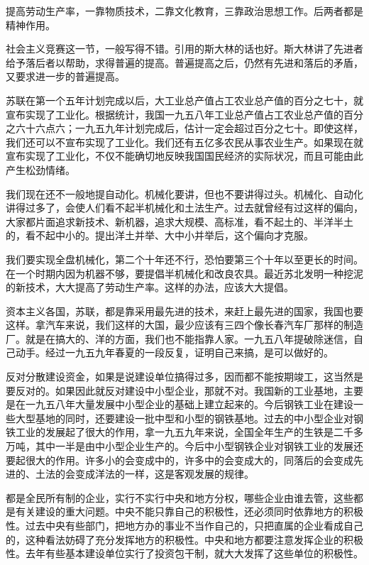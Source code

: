 提高劳动生产率，一靠物质技术，二靠文化教育，三靠政治思想工作。后两者都是精神作用。

社会主义竞赛这一节，一般写得不错。引用的斯大林的话也好。斯大林讲了先进者给予落后者以帮助，求得普遍的提高。普遍提高之后，仍然有先进和落后的矛盾，又要求进一步的普遍提高。

苏联在第一个五年计划完成以后，大工业总产值占工农业总产值的百分之七十，就宣布实现了工业化。根据统计，我国一九五八年工业总产值占工农业总产值的百分之六十六点六；一九五九年计划完成后，估计一定会超过百分之七十。即使这样，我们还可以不宣布实现了工业化。我们还有五亿多农民从事农业生产。如果现在就宣布实现了工业化，不仅不能确切地反映我国国民经济的实际状况，而且可能由此产生松劲情绪。

我们现在还不一般地提自动化。机械化要讲，但也不要讲得过头。机械化、自动化讲得过多了，会使人们看不起半机械化和土法生产。过去就曾经有过这样的偏向，大家都片面追求新技术、新机器，追求大规模、高标准，看不起土的、半洋半土的，看不起中小的。提出洋土并举、大中小并举后，这个偏向才克服。

我们要实现全盘机械化，第二个十年还不行，恐怕要第三个十年以至更长的时间。在一个时期内因为机器不够，要提倡半机械化和改良农具。最近苏北发明一种挖泥的新技术，大大提高了劳动生产率。这样的办法，应该大大提倡。

资本主义各国，苏联，都是靠采用最先进的技术，来赶上最先进的国家，我国也要这样。拿汽车来说，我们这样的大国，最少应该有三四个像长春汽车厂那样的制造厂。就是在搞大的、洋的方面，我们也不能指靠人家。一九五八年提破除迷信，自己动手。经过一九五九年春夏的一段反复，证明自己来搞，是可以做好的。

反对分散建设资金，如果是说建设单位搞得过多，因而都不能按期竣工，这当然是要反对的。如果因此就反对建设中小型企业，那就不对。我国新的工业基地，主要是在一九五八年大量发展中小型企业的基础上建立起来的。今后钢铁工业在建设一些大型基地的同时，还要建设一批中型和小型的钢铁基地。过去的中小型企业对钢铁工业的发展起了很大的作用，拿一九五九年来说，全国全年生产的生铁是二千多万吨，其中一半是由中小型企业生产的。今后中小型钢铁企业对钢铁工业的发展还要起很大的作用。许多小的会变成中的，许多中的会变成大的，同落后的会变成先进的、土法的会变成洋法的一样，这是客观发展的规律。

都是全民所有制的企业，实行不实行中央和地方分权，哪些企业由谁去管，这些都是有关建设的重大问题。中央不能只靠自己的积极性，还必须同时依靠地方的积极性。过去中央有些部门，把地方办的事业不当作自己的，只把直属的企业看成自己的，这种看法妨碍了充分发挥地方的积极性。中央和地方都要注意发挥企业的积极性。去年有些基本建设单位实行了投资包干制，就大大发挥了这些单位的积极性。

